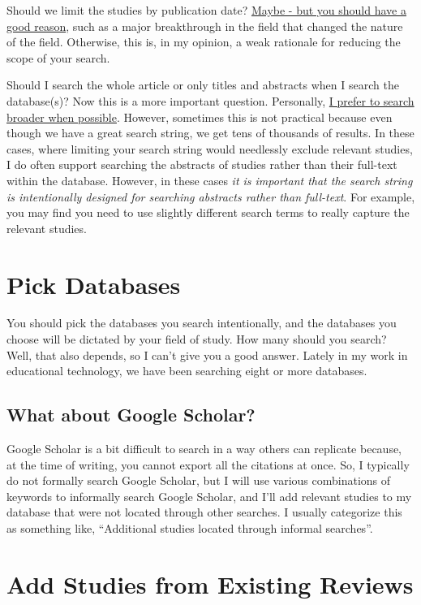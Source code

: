 \documentclass[
]{book}
\begin{document}
Should we limit the studies by publication date? \ul{Maybe - but you should have a good reason}, such as a major breakthrough in the field that changed the nature of the field. Otherwise, this is, in my opinion, a weak rationale for reducing the scope of your search.

Should I search the whole article or only titles and abstracts when I search the database(s)? Now this is a more important question. Personally, \ul{I prefer to search broader when possible}. However, sometimes this is not practical because even though we have a great search string, we get tens of thousands of results. In these cases, where limiting your search string would needlessly exclude relevant studies, I do often support searching the abstracts of studies rather than their full-text within the database. However, in these cases \emph{it is important that the search string is intentionally designed for searching abstracts rather than full-text}. For example, you may find you need to use slightly different search terms to really capture the relevant studies.

\hypertarget{pick-databases}{%
\section{Pick Databases}\label{pick-databases}}

You should pick the databases you search intentionally, and the databases you choose will be dictated by your field of study. How many should you search? Well, that also depends, so I can't give you a good answer. Lately in my work in educational technology, we have been searching eight or more databases.

\hypertarget{what-about-google-scholar}{%
\subsection{What about Google Scholar?}\label{what-about-google-scholar}}

Google Scholar is a bit difficult to search in a way others can replicate because, at the time of writing, you cannot export all the citations at once. So, I typically do not formally search Google Scholar, but I will use various combinations of keywords to informally search Google Scholar, and I'll add relevant studies to my database that were not located through other searches. I usually categorize this as something like, ``Additional studies located through informal searches''.

\hypertarget{add-studies-from-existing-reviews}{%
\section{Add Studies from Existing Reviews}\label{add-studies-from-existing-reviews}}
\end{document}
